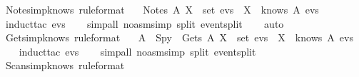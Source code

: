 \begin{isabellebody}
  \isanewline
  \isanewline
  \endisatagproof
  {\isafoldproof}%
  \isadelimproof
  \isanewline
  \endisadelimproof
  \isamarkupfalse%
  \ Notes{\isacharunderscore}imp{\isacharunderscore}knows\ {\isacharbrackleft}rule{\isacharunderscore}format{\isacharbrackright}\ {\isacharcolon}\isanewline
  \ \ {\isachardoublequoteopen}Notes\ A\ X\ {\isasymin}\ set\ evs\ {\isasymlongrightarrow}\ X\ {\isasymin}\ knows\ A\ evs{\isachardoublequoteclose}\isanewline
  \isadelimproof
  \isanewline
  \ \ %
  \endisadelimproof
  \isatagproof
  \isamarkupfalse%
  \ {\isacharparenleft}induct{\isacharunderscore}tac\ {\isachardoublequoteopen}evs{\isachardoublequoteclose}{\isacharparenright}\isanewline
  \ \ \isamarkupfalse%
  \ {\isacharparenleft}simp{\isacharunderscore}all\ {\isacharparenleft}no{\isacharunderscore}asm{\isacharunderscore}simp{\isacharparenright}\ split{\isacharcolon}\ event{\isachardot}split{\isacharparenright}\isanewline
  \ \ \isamarkupfalse%
  \ {\isacharparenleft}auto{\isacharparenright}\isanewline
  \isamarkupfalse%
  \isanewline
  \isanewline
  \endisatagproof
  {\isafoldproof}%
  \isadelimproof
  \isanewline
  \endisadelimproof
  \isamarkupfalse%
  \ Gets{\isacharunderscore}imp{\isacharunderscore}knows\ {\isacharbrackleft}rule{\isacharunderscore}format{\isacharbrackright}\ {\isacharcolon}\isanewline
  \ \ {\isachardoublequoteopen}A\ {\isasymnoteq}\ Spy\ {\isasymlongrightarrow}\ Gets\ A\ X\ {\isasymin}\ set\ evs\ {\isasymlongrightarrow}\ X\ {\isasymin}\ knows\ A\ evs{\isachardoublequoteclose}\isanewline
  \isadelimproof
  \isanewline
  \ \ %
  \endisadelimproof
  \isatagproof
  \isamarkupfalse%
  \ {\isacharparenleft}induct{\isacharunderscore}tac\ {\isachardoublequoteopen}evs{\isachardoublequoteclose}{\isacharparenright}\isanewline
  \ \ \isamarkupfalse%
  \ {\isacharparenleft}simp{\isacharunderscore}all\ {\isacharparenleft}no{\isacharunderscore}asm{\isacharunderscore}simp{\isacharparenright}\ split{\isacharcolon}\ event{\isachardot}split{\isacharparenright}\isanewline
  \isamarkupfalse%
  \isanewline
  \isanewline
  \endisatagproof
  {\isafoldproof}%
  \isadelimproof
  \isanewline
  \endisadelimproof
  \isamarkupfalse%
  \ Scans{\isacharunderscore}imp{\isacharunderscore}knows\ {\isacharbrackleft}rule{\isacharunderscore}format{\isacharbrackright}\ {\isacharcolon}\isanewline

\end{isabellebody}
